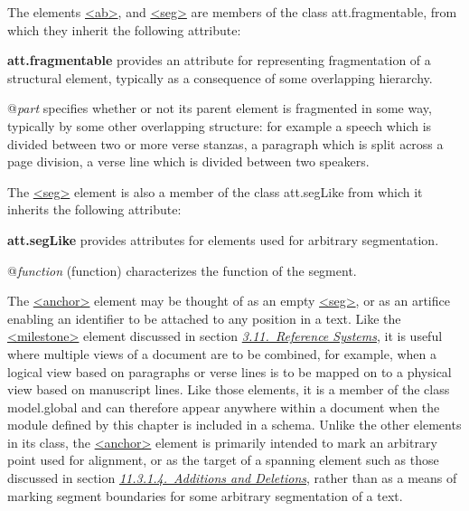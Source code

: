  The elements \hyperref[TEI.ab]{<ab>}, and \hyperref[TEI.seg]{<seg>} are members of the class \textsf{att.fragmentable}, from which they inherit the following attribute: 
\begin{sansreflist}
  
\item [\textbf{att.fragmentable}] provides an attribute for representing fragmentation of a structural element, typically as a consequence of some overlapping hierarchy.\hfil\\[-10pt]\begin{sansreflist}
    \item[@{\itshape part}]
  specifies whether or not its parent element is fragmented in some way, typically by some other overlapping structure: for example a speech which is divided between two or more verse stanzas, a paragraph which is split across a page division, a verse line which is divided between two speakers.
\end{sansreflist}  
\end{sansreflist}
 The \hyperref[TEI.seg]{<seg>} element is also a member of the class \textsf{att.segLike} from which it inherits the following attribute: 
\begin{sansreflist}
  
\item [\textbf{att.segLike}] provides attributes for elements used for arbitrary segmentation.\hfil\\[-10pt]\begin{sansreflist}
    \item[@{\itshape function}]
  (function) characterizes the function of the segment.
\end{sansreflist}  
\end{sansreflist}
\par
The \hyperref[TEI.anchor]{<anchor>} element may be thought of as an empty \hyperref[TEI.seg]{<seg>}, or as an artifice enabling an identifier to be attached to any position in a text. Like the \hyperref[TEI.milestone]{<milestone>} element discussed in section \textit{\hyperref[CORS]{3.11.\ Reference Systems}}, it is useful where multiple views of a document are to be combined, for example, when a logical view based on paragraphs or verse lines is to be mapped on to a physical view based on manuscript lines. Like those elements, it is a member of the class \textsf{model.global} and can therefore appear anywhere within a document when the module defined by this chapter is included in a schema. Unlike the other elements in its class, the \hyperref[TEI.anchor]{<anchor>} element is primarily intended to mark an arbitrary point used for alignment, or as the target of a spanning element such as those discussed in section \textit{\hyperref[PHAD]{11.3.1.4.\ Additions and Deletions}}, rather than as a means of marking segment boundaries for some arbitrary segmentation of a text.\par
